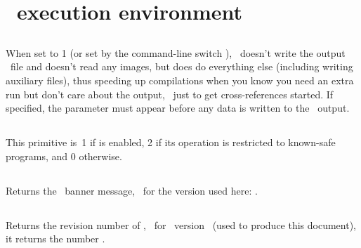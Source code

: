 \documentclass{pdftexmanual}
\begin{document}
\section{\PDFTEX\ execution environment}

\subsection{}

When set to 1 (or set by the command-line switch ),
\PDFTEX\ doesn't write the output \PDF\ file and doesn't read any
images, but does do everything else (including writing auxiliary files),
thus speeding up compilations when you know you need an extra run but
don't care about the output, \eg\ just to get cross-references started.
If specified, the parameter must appear before any data is written to
the \PDF\ output. 

\subsection{}

This primitive is~1 if  is enabled, 2 if its operation is
restricted to known-safe programs, and 0 otherwise. 

\subsection{}

Returns the \PDFTEX\ banner message, \eg\ for the version used here:
{\tt \pdftexbanner}. 

\subsection{}

Returns the revision number of \PDFTEX, \eg\ for \PDFTEX\ version
\currentpdftex\ (used to produce this document), it returns the number
{\tt \pdftexrevision}.

\subsection{}
\end{document}
